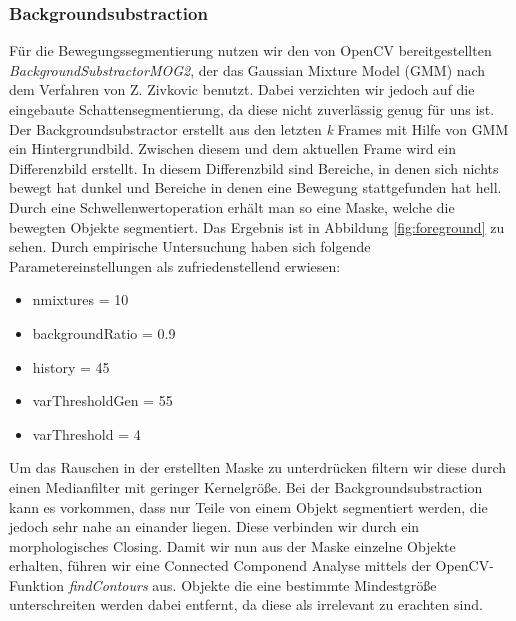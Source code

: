 \documentclass[conference]{IEEEtran}
\begin{document}
\subsubsection{Backgroundsubstraction}

Für die Bewegungssegmentierung nutzen wir den von OpenCV bereitgestellten \textit{BackgroundSubstractorMOG2}, der das Gaussian Mixture Model (GMM) nach dem Verfahren von Z. Zivkovic \cite{zivkovic} benutzt. Dabei verzichten wir jedoch auf die eingebaute Schattensegmentierung, da diese nicht zuverlässig genug für uns ist. Der Backgroundsubstractor erstellt aus den letzten \textit{k} Frames mit Hilfe von GMM ein Hintergrundbild. Zwischen diesem und dem aktuellen Frame wird ein Differenzbild erstellt. In diesem Differenzbild sind Bereiche, in denen sich nichts bewegt hat dunkel und Bereiche in denen eine Bewegung stattgefunden hat hell. Durch eine Schwellenwertoperation erhält man so eine Maske, welche die bewegten Objekte segmentiert. Das Ergebnis ist in Abbildung \ref{fig:foreground} zu sehen.
Durch empirische Untersuchung haben sich folgende Parametereinstellungen als zufriedenstellend erwiesen:
\begin{itemize}
	\item nmixtures = 10
	\item backgroundRatio = 0.9
	\item history = 45
	\item varThresholdGen = 55
	\item varThreshold = 4
\end{itemize}
Um das Rauschen in der erstellten Maske zu unterdrücken filtern wir diese durch einen Medianfilter mit geringer Kernelgröße. Bei der Backgroundsubstraction kann es vorkommen, dass nur Teile von einem Objekt segmentiert werden, die jedoch sehr nahe an einander liegen. Diese verbinden wir durch ein morphologisches Closing.
Damit wir nun aus der Maske einzelne Objekte erhalten, führen wir eine Connected Componend Analyse mittels der OpenCV-Funktion \textit{findContours} aus. Objekte die eine bestimmte Mindestgröße unterschreiten werden dabei entfernt, da diese als irrelevant zu erachten sind.


\end{document}
